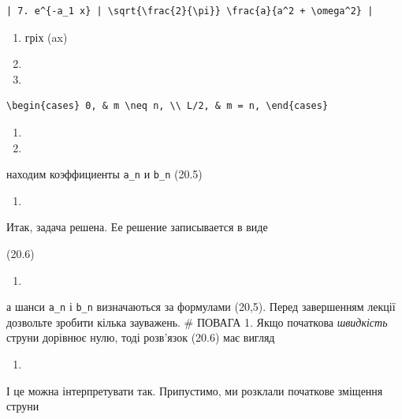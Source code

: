 \documentclass[
  ukrainian,
]{article}
\providecommand{\tightlist}{%
  \setlength{\itemsep}{0pt}\setlength{\parskip}{0pt}}
\begin{document}
\begin{verbatim}
| 7. e^{-a_1 x} | \sqrt{\frac{2}{\pi}} \frac{a}{a^2 + \omega^2} |
\end{verbatim}

\begin{enumerate}
\def\labelenumi{\arabic{enumi}.}
\setcounter{enumi}{19}
\item
  гріх (ax)
\item
\item
\end{enumerate}

\begin{verbatim}
\begin{cases} 0, & m \neq n, \\ L/2, & m = n, \end{cases}
\end{verbatim}

\begin{enumerate}
\def\labelenumi{\arabic{enumi}.}
\setcounter{enumi}{9}
\tightlist
\item
\item
\end{enumerate}

находим коэффициенты \texttt{a\_n} и \texttt{b\_n} (20.5)

\begin{enumerate}
\def\labelenumi{\arabic{enumi}.}
\setcounter{enumi}{11}
\tightlist
\item
\end{enumerate}

Итак, задача решена. Ее решение записывается в виде

(20.6)

\begin{enumerate}
\def\labelenumi{\arabic{enumi}.}
\setcounter{enumi}{12}
\tightlist
\item
\end{enumerate}

а шанси \texttt{a\_n} і \texttt{b\_n} визначаються за формулами (20,5).
Перед завершенням лекції дозвольте зробити кілька зауважень. \# ПОВАГА
1. Якщо початкова \emph{швидкість} струни дорівнює нулю, тоді розв'язок
(20.6) має вигляд

\begin{enumerate}
\def\labelenumi{\arabic{enumi}.}
\setcounter{enumi}{13}
\tightlist
\item
\end{enumerate}

І це можна інтерпретувати так. Припустимо, ми розклали початкове
зміщення струни
\end{document}
